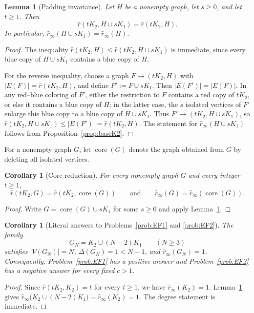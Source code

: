 \documentclass[11pt]{article}
\newcommand{\sr}{\hat r}
\newcommand{\sri}{\hat r_{\infty}}
\newcommand{\core}{\operatorname{core}}
\newtheorem{lemma}[theorem]{Lemma}
\newtheorem{corollary}[theorem]{Corollary}
\theoremstyle{definition}
\theoremstyle{remark}
\newcounter{case}
\begin{document}
\begin{lemma}[Padding invariance]\label{lem:padding}
Let $H$ be a nonempty graph, let $s\ge 0$, and let $t\ge 1$. Then
\[
\sr(tK_2,H\cup sK_1)=\sr(tK_2,H).
\]
In particular,
$\sri(H\cup sK_1)=\sri(H)$.
\end{lemma}

\begin{proof}
The inequality
$\sr(tK_2,H)\le \sr(tK_2,H\cup sK_1)$
is immediate, since every blue copy of $H\cup sK_1$ contains a blue copy of $H$.

For the reverse inequality, choose a graph $F\to(tK_2,H)$ with
$|E(F)|=\sr(tK_2,H)$, and define
$F':=F\cup sK_1$.
Then $|E(F')|=|E(F)|$. In any red--blue coloring of $F'$, either the restriction to $F$
contains a red copy of $tK_2$, or else it contains a blue copy of $H$; in the latter case, the
$s$ isolated vertices of $F'$ enlarge this blue copy to a blue copy of $H\cup sK_1$. Thus
$F'\to(tK_2,H\cup sK_1)$, so
$\sr(tK_2,H\cup sK_1)\le |E(F')|=\sr(tK_2,H)$.
The statement for $\sri (H\cup sK_1)$ follows from Proposition~\ref{prop:baseK2}.
\end{proof}

For a nonempty graph $G$, let $\core(G)$ denote the graph obtained from $G$ by deleting
all isolated vertices.

\begin{corollary}[Core reduction]\label{cor:core}
For every nonempty graph $G$ and every integer $t\ge 1$,
\[
\sr(tK_2,G)=\sr(tK_2,\core(G))
\qquad\text{and}\qquad
\sri(G)=\sri(\core(G)).
\]
\end{corollary}

\begin{proof}
Write $G=\core(G)\cup sK_1$ for some $s\ge 0$ and apply
Lemma~\ref{lem:padding}.
\end{proof}

\begin{corollary}[Literal answers to Problems~\ref{prob:EF1} and \ref{prob:EF2}]
\label{cor:literal}
The family
\[
G_N=K_2\cup (N-2)K_1
\qquad (N\ge 3)
\]
satisfies
$|V(G_N)|=N$, $\Delta(G_N)=1<N-1$, and $\sri(G_N)=1$.
Consequently, Problem~\ref{prob:EF1} has a positive answer and
Problem~\ref{prob:EF2} has a negative answer for every fixed $c>1$.
\end{corollary}

\begin{proof}
Since $\sr(tK_2,K_2)=t$ for every $t\ge 1$, we have $\sri(K_2)=1$.
Lemma~\ref{lem:padding} gives
$\sri\bigl(K_2\cup (N-2)K_1\bigr)=\sri(K_2)=1$.
The degree statement is immediate.
\end{proof}
\end{document}
